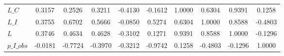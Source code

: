 \begin{center}
\begin{longtable}{lccccccccc}
$L\_C            $	 & 	            0.3157	 & 	            0.2526	 & 	            0.3211	 & 	           -0.4130	 & 	           -0.1612	 & 	            1.0000	 & 	            0.6304	 & 	            0.9391	 & 	            0.1258 \\ 
$L\_I            $	 & 	            0.3755	 & 	            0.6702	 & 	            0.5666	 & 	           -0.0850	 & 	            0.5274	 & 	            0.6304	 & 	            1.0000	 & 	            0.8588	 & 	           -0.4803 \\ 
$L               $	 & 	            0.3746	 & 	            0.4634	 & 	            0.4628	 & 	           -0.3102	 & 	            0.1271	 & 	            0.9391	 & 	            0.8588	 & 	            1.0000	 & 	           -0.1296 \\ 
$p\_I\_obs       $	 & 	           -0.0181	 & 	           -0.7724	 & 	           -0.3970	 & 	           -0.3212	 & 	           -0.9742	 & 	            0.1258	 & 	           -0.4803	 & 	           -0.1296	 & 	            1.0000 \\ 
\end{longtable}
 \end{center}
